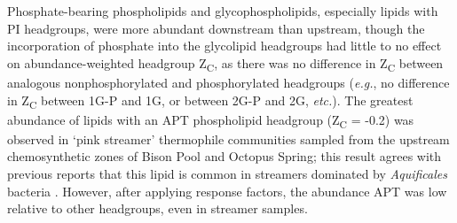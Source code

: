 Phosphate-bearing phospholipids and glycophospholipids, especially lipids with PI headgroups, were more abundant downstream than upstream, though the incorporation of phosphate into the glycolipid headgroups had little to no effect on abundance-weighted headgroup Z\textsubscript{C}, as there was no difference in Z\textsubscript{C} between analogous nonphosphorylated and phosphorylated headgroups (\textit{e.g.}, no difference in Z\textsubscript{C} between 1G-P and 1G, or between 2G-P and 2G, \textit{etc.}). The greatest abundance of lipids with an APT phospholipid headgroup (Z\textsubscript{C} = -0.2) was observed in `pink streamer' thermophile communities sampled from the upstream chemosynthetic zones of Bison Pool and Octopus Spring; this result agrees with previous reports that this lipid is common in streamers dominated by \textit{Aquificales} bacteria \citep{Sturt_Intact_2004, schubotz2013spatial}. However, after applying response factors, the abundance APT was low relative to other headgroups, even in streamer samples.



